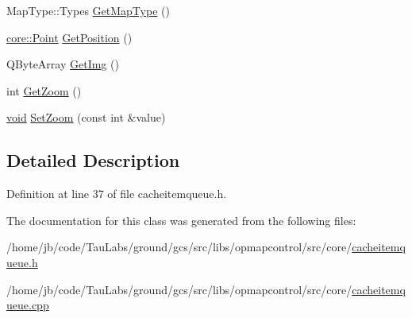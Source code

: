 \begin{DoxyCompactItemize}
\item 
\-Map\-Type\-::\-Types \hyperlink{group___o_p_map_widget_gac72aa0d2725fa7a43d69620e086eb6b4}{\-Get\-Map\-Type} ()
\item 
\hyperlink{structcore_1_1_point}{core\-::\-Point} \hyperlink{group___o_p_map_widget_ga1fa7cca0baacf348206a3f015041f07b}{\-Get\-Position} ()
\item 
\-Q\-Byte\-Array \hyperlink{group___o_p_map_widget_ga6a02a2e0a6cefcd82c2fad88dcdbd89e}{\-Get\-Img} ()
\item 
int \hyperlink{group___o_p_map_widget_gadfe7e49ddc244b2d8b26f9087d954f7d}{\-Get\-Zoom} ()
\item 
\hyperlink{group___u_a_v_objects_plugin_ga444cf2ff3f0ecbe028adce838d373f5c}{void} \hyperlink{group___o_p_map_widget_ga0780a9a7876dc6fbb7aa3bc7b5465956}{\-Set\-Zoom} (const int \&value)
\end{DoxyCompactItemize}


\subsection{\-Detailed \-Description}


\-Definition at line 37 of file cacheitemqueue.\-h.



\-The documentation for this class was generated from the following files\-:\begin{DoxyCompactItemize}
\item 
/home/jb/code/\-Tau\-Labs/ground/gcs/src/libs/opmapcontrol/src/core/\hyperlink{cacheitemqueue_8h}{cacheitemqueue.\-h}\item 
/home/jb/code/\-Tau\-Labs/ground/gcs/src/libs/opmapcontrol/src/core/\hyperlink{cacheitemqueue_8cpp}{cacheitemqueue.\-cpp}\end{DoxyCompactItemize}
